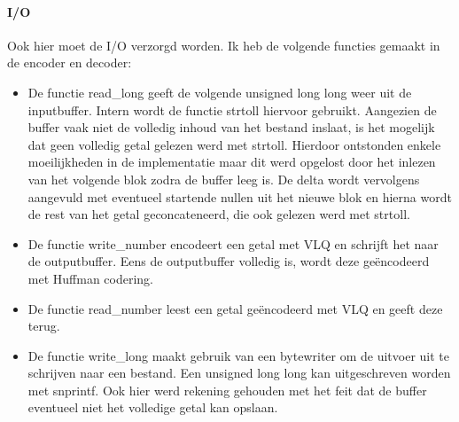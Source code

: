 \documentclass[11pt, a4paper]{article}
\begin{document}
\paragraph{I/O}
Ook hier moet de I/O verzorgd worden. Ik heb de volgende functies gemaakt in de encoder en decoder: 
\begin{itemize}
	\item De functie read\_long geeft de volgende unsigned long long weer uit de inputbuffer. Intern wordt de functie strtoll hiervoor gebruikt. Aangezien de buffer vaak niet de volledig inhoud van het bestand inslaat, is het mogelijk dat geen volledig getal gelezen werd met strtoll. Hierdoor ontstonden enkele moeilijkheden in de implementatie maar dit werd opgelost door het inlezen van het volgende blok zodra de buffer leeg is. De delta wordt vervolgens aangevuld met eventueel startende nullen uit het nieuwe blok en hierna wordt de rest van het getal geconcateneerd, die ook gelezen werd met strtoll. 
	\item De functie write\_number encodeert een getal met VLQ en schrijft het naar de outputbuffer. Eens de outputbuffer volledig is, wordt deze ge\"{e}ncodeerd met Huffman codering. 
	\item De functie read\_number leest een getal ge\"{e}ncodeerd met VLQ en geeft deze terug. 
	\item De functie write\_long maakt gebruik van een bytewriter om de uitvoer uit te schrijven naar een bestand. Een unsigned long long kan uitgeschreven worden met snprintf. Ook hier werd rekening gehouden met het feit dat de buffer eventueel niet het volledige getal kan opslaan. 
\end{itemize}
\FloatBarrier
\end{document}
